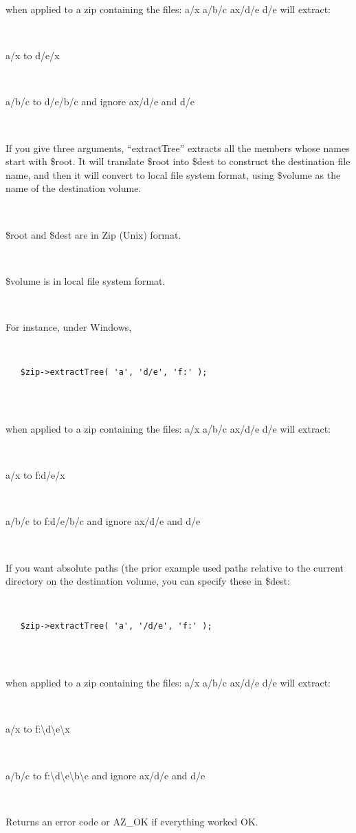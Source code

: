 \documentclass[]{article}
\begin{document}
\begin{description}
when applied to a zip containing the files: a/x a/b/c ax/d/e d/e will
extract:

~

a/x to d/e/x

~

a/b/c to d/e/b/c and ignore ax/d/e and d/e

~

If you give three arguments, ``extractTree'' extracts all the members
whose names start with \$root. It will translate \$root into \$dest to
construct the destination file name, and then it will convert to local
file system format, using \$volume as the name of the destination
volume.

~

\$root and \$dest are in Zip (Unix) format.

~

\$volume is in local file system format.

~

For instance, under Windows,

~

\begin{verbatim}
   $zip->extractTree( 'a', 'd/e', 'f:' );
    
\end{verbatim}

~

when applied to a zip containing the files: a/x a/b/c ax/d/e d/e will
extract:

~

a/x to f:d/e/x

~

a/b/c to f:d/e/b/c and ignore ax/d/e and d/e

~

If you want absolute paths (the prior example used paths relative to the
current directory on the destination volume, you can specify these in
\$dest:

~

\begin{verbatim}
   $zip->extractTree( 'a', '/d/e', 'f:' );
    
\end{verbatim}

~

when applied to a zip containing the files: a/x a/b/c ax/d/e d/e will
extract:

~

a/x to f:\textbackslash{}d\textbackslash{}e\textbackslash{}x

~

a/b/c to
f:\textbackslash{}d\textbackslash{}e\textbackslash{}b\textbackslash{}c
and ignore ax/d/e and d/e

~

Returns an error code or AZ\_OK if everything worked OK.
\end{description}
\end{document}
